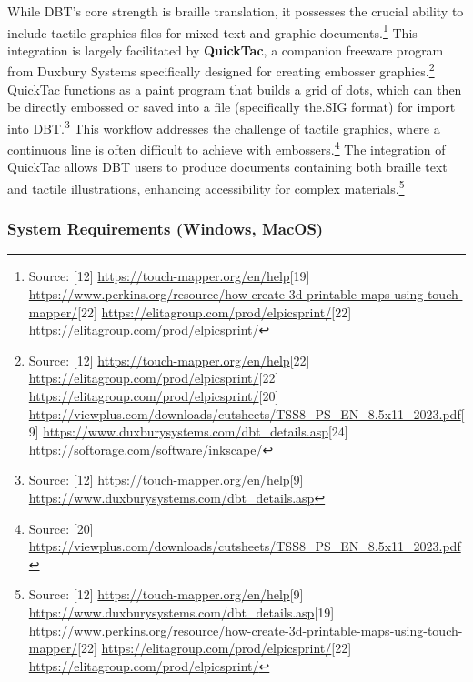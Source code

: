 While DBT's core strength is braille translation, it possesses the crucial ability to include tactile graphics files for mixed text-and-graphic documents.\footnote{Source: [12] \url{https://touch-mapper.org/en/help}[19] \url{https://www.perkins.org/resource/how-create-3d-printable-maps-using-touch-mapper/}[22] \url{https://elitagroup.com/prod/elpicsprint/}[22] \url{https://elitagroup.com/prod/elpicsprint/}} This integration is largely facilitated by \textbf{QuickTac}, a companion freeware program from Duxbury Systems specifically designed for creating embosser graphics.\footnote{Source: [12] \url{https://touch-mapper.org/en/help}[22] \url{https://elitagroup.com/prod/elpicsprint/}[22] \url{https://elitagroup.com/prod/elpicsprint/}[20] \url{https://viewplus.com/downloads/cutsheets/TSS8_PS_EN_8.5x11_2023.pdf}[9] \url{https://www.duxburysystems.com/dbt_details.asp}[24] \url{https://softorage.com/software/inkscape/}} QuickTac functions as a paint program that builds a grid of dots, which can then be directly embossed or saved into a file (specifically the.SIG format) for import into DBT.\footnote{Source: [12] \url{https://touch-mapper.org/en/help}[9] \url{https://www.duxburysystems.com/dbt_details.asp}} This workflow addresses the challenge of tactile graphics, where a continuous line is often difficult to achieve with embossers.\footnote{Source: [20] \url{https://viewplus.com/downloads/cutsheets/TSS8_PS_EN_8.5x11_2023.pdf}} The integration of QuickTac allows DBT users to produce documents containing both braille text and tactile illustrations, enhancing accessibility for complex materials.\footnote{Source: [12] \url{https://touch-mapper.org/en/help}[9] \url{https://www.duxburysystems.com/dbt_details.asp}[19] \url{https://www.perkins.org/resource/how-create-3d-printable-maps-using-touch-mapper/}[22] \url{https://elitagroup.com/prod/elpicsprint/}[22] \url{https://elitagroup.com/prod/elpicsprint/}}

\subsubsection{System Requirements (Windows, MacOS)}

